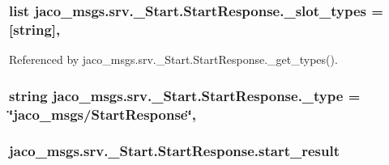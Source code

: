 \subsubsection[{\texorpdfstring{\+\_\+slot\+\_\+types}{_slot_types}}]{\setlength{\rightskip}{0pt plus 5cm}list jaco\+\_\+msgs.\+srv.\+\_\+\+Start.\+Start\+Response.\+\_\+slot\+\_\+types = \mbox{[}\textquotesingle{}string\textquotesingle{}\mbox{]}\hspace{0.3cm}{\ttfamily [static]}, {\ttfamily [private]}}\hypertarget{classjaco__msgs_1_1srv_1_1__Start_1_1StartResponse_a6d420b6cb37998640f06d63d1939195d}{}\label{classjaco__msgs_1_1srv_1_1__Start_1_1StartResponse_a6d420b6cb37998640f06d63d1939195d}


Referenced by jaco\+\_\+msgs.\+srv.\+\_\+\+Start.\+Start\+Response.\+\_\+get\+\_\+types().

\subsubsection[{\texorpdfstring{\+\_\+type}{_type}}]{\setlength{\rightskip}{0pt plus 5cm}string jaco\+\_\+msgs.\+srv.\+\_\+\+Start.\+Start\+Response.\+\_\+type = \char`\"{}jaco\+\_\+msgs/{\bf Start\+Response}\char`\"{}\hspace{0.3cm}{\ttfamily [static]}, {\ttfamily [private]}}\hypertarget{classjaco__msgs_1_1srv_1_1__Start_1_1StartResponse_a9e46790a7d93531a6a7d29513153d8cb}{}\label{classjaco__msgs_1_1srv_1_1__Start_1_1StartResponse_a9e46790a7d93531a6a7d29513153d8cb}
\subsubsection[{\texorpdfstring{start\+\_\+result}{start_result}}]{\setlength{\rightskip}{0pt plus 5cm}jaco\+\_\+msgs.\+srv.\+\_\+\+Start.\+Start\+Response.\+start\+\_\+result}\hypertarget{classjaco__msgs_1_1srv_1_1__Start_1_1StartResponse_a62f332f9a7e3128e9b27343abd5e715e}{}\label{classjaco__msgs_1_1srv_1_1__Start_1_1StartResponse_a62f332f9a7e3128e9b27343abd5e715e}



